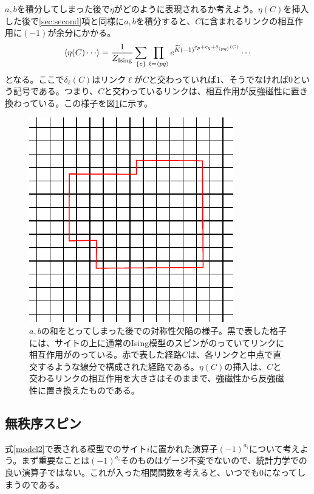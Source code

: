 \documentclass[a4paper,12pt,dvipdfmx]{jlreq}
\newcommand{\Kt}{\widetilde{K}}
\newcommand{\ZIs}{Z_{\mathrm{Ising}}}
\begin{document}
$a,b$を積分してしまった後で$\eta$がどのように表現されるか考えよう。$\eta(C)$を挿入した後で\ref{sec:second}項と同様に$a,b$を積分すると、$C$に含まれるリンクの相互作用に$(-1)$が余分にかかる。
\begin{align}
  \expval{\eta(C)\cdots}
  =\frac{1}{\ZIs}\sum_{\{c\}}\prod_{\ell=\expval{pq}} e^{\Kt(-1)^{c_p+c_q+\delta_{\expval{pq}}(C)}}\cdots
\end{align}
となる。ここで$\delta_{\ell}(C)$はリンク$\ell$が$C$と交わっていれば$1$、そうでなければ$0$という記号である。つまり、$C$と交わっているリンクは、相互作用が反強磁性に置き換わっている。この様子を図\ref{fig:z2defect}に示す。


\begin{figure}
  \centering
  \includegraphics{z2defect.pdf}
  \caption{$a,b$の和をとってしまった後での対称性欠陥の様子。黒で表した格子には、サイトの上に通常のIsing模型のスピンがのっていてリンクに相互作用がのっている。赤で表した経路$C$は、各リンクと中点で直交するような線分で構成された経路である。$\eta(C)$の挿入は、$C$と交わるリンクの相互作用を大きさはそのままで、強磁性から反強磁性に置き換えたものである。}
  \label{fig:z2defect}
\end{figure}
\subsection{無秩序スピン}
式\eqref{model2}で表される模型でのサイト$i$に置かれた演算子$(-1)^{a_i}$について考えよう。まず重要なことは$(-1)^{a_i}$そのものはゲージ不変でないので、統計力学での良い演算子ではない。これが入った相関関数を考えると、いつでも$0$になってしまうのである。
\end{document}
